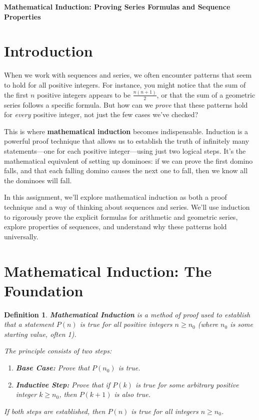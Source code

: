 \documentclass[12pt]{article}
\newtheorem{definition}{Definition}
\begin{document}
\begin{center}
\textbf{\Large Mathematical Induction: Proving Series Formulas and Sequence Properties} \\
\vspace{0.5cm}
\hspace{0.1\textwidth}
\end{center}

\vspace{0.5cm}

\section{Introduction}

When we work with sequences and series, we often encounter patterns that seem to hold for all positive integers. For instance, you might notice that the sum of the first $n$ positive integers appears to be $\frac{n(n+1)}{2}$, or that the sum of a geometric series follows a specific formula. But how can we \textit{prove} that these patterns hold for \textit{every} positive integer, not just the few cases we've checked?

This is where \textbf{mathematical induction} becomes indispensable. Induction is a powerful proof technique that allows us to establish the truth of infinitely many statements—one for each positive integer—using just two logical steps. It's the mathematical equivalent of setting up dominoes: if we can prove the first domino falls, and that each falling domino causes the next one to fall, then we know all the dominoes will fall.

In this assignment, we'll explore mathematical induction as both a proof technique and a way of thinking about sequences and series. We'll use induction to rigorously prove the explicit formulas for arithmetic and geometric series, explore properties of sequences, and understand why these patterns hold universally.

\section{Mathematical Induction: The Foundation}

\begin{definition}
\textbf{Mathematical Induction} is a method of proof used to establish that a statement $P(n)$ is true for all positive integers $n \geq n_0$ (where $n_0$ is some starting value, often 1).

The principle consists of two steps:
\begin{enumerate}
\item \textbf{Base Case:} Prove that $P(n_0)$ is true.
\item \textbf{Inductive Step:} Prove that if $P(k)$ is true for some arbitrary positive integer $k \geq n_0$, then $P(k+1)$ is also true.
\end{enumerate}

If both steps are established, then $P(n)$ is true for all integers $n \geq n_0$.
\end{definition}
\end{document}
